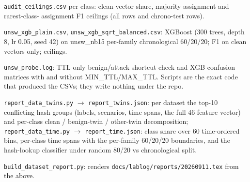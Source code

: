 \par\noindent \textbullet\enspace \texttt{audit\_\allowbreak{}\allowbreak{}ce\allowbreak{}ilings.\allowbreak{}c\allowbreak{}sv} per class: clean-vector share, majority-assignment and rarest-class- assignment F1 ceilings (all rows and chrono-test rows).


\par\noindent \textbullet\enspace \texttt{unsw\_\allowbreak{}\allowbreak{}xgb\allowbreak{}\_\allowbreak{}\allowbreak{}plain.\allowbreak{}c\allowbreak{}sv}, \texttt{unsw\_\allowbreak{}\allowbreak{}xgb\allowbreak{}\_\allowbreak{}\allowbreak{}sqrt\_\allowbreak{}\allowbreak{}ba\allowbreak{}lanced.\allowbreak{}c\allowbreak{}sv}: XGBoost (300 trees, depth 8, lr 0.05, seed 42) on unsw\_\allowbreak{}nb15 per-family chronological 60/\allowbreak{}20/\allowbreak{}20; F1 on clean vectors only; ceilings.


\par\noindent \textbullet\enspace \texttt{unsw\_\allowbreak{}\allowbreak{}pro\allowbreak{}be.\allowbreak{}log}: TTL-only benign/\allowbreak{}attack shortcut check and XGB confusion matrices with and without MIN\_\allowbreak{}TTL/\allowbreak{}MAX\_\allowbreak{}TTL. Scripts are the exact code that produced the CSVs; they write nothing under the repo.


\par\noindent \textbullet\enspace \texttt{report\_\allowbreak{}\allowbreak{}d\allowbreak{}ata\_\allowbreak{}\allowbreak{}twin\allowbreak{}s.\allowbreak{}py}  \ensuremath{\rightarrow}  \texttt{report\_\allowbreak{}\allowbreak{}t\allowbreak{}wins.\allowbreak{}jso\allowbreak{}n}: per dataset the top-10 conflicting hash groups (labels, scenarios, time spans, the full 46-feature vector) and per-class clean /\allowbreak{} benign-twin /\allowbreak{} other-twin decomposition; \texttt{report\_\allowbreak{}\allowbreak{}d\allowbreak{}ata\_\allowbreak{}\allowbreak{}time\allowbreak{}.\allowbreak{}py}  \ensuremath{\rightarrow}  \texttt{report\_\allowbreak{}\allowbreak{}t\allowbreak{}ime.\allowbreak{}json\allowbreak{}}: class share over 60 time-ordered bins, per-class time spans with the per-family 60/\allowbreak{}20/\allowbreak{}20 boundaries, and the hash-lookup classifier under random 80/\allowbreak{}20 vs chronological split.


\par\noindent \textbullet\enspace \texttt{build\_\allowbreak{}\allowbreak{}da\allowbreak{}taset\_\allowbreak{}\allowbreak{}re\allowbreak{}port.\allowbreak{}py}: renders \texttt{docs/\allowbreak{}\allowbreak{}lab\allowbreak{}log/\allowbreak{}\allowbreak{}repo\allowbreak{}rts/\allowbreak{}\allowbreak{}2026\allowbreak{}0911.\allowbreak{}tex\allowbreak{}} from the above.





